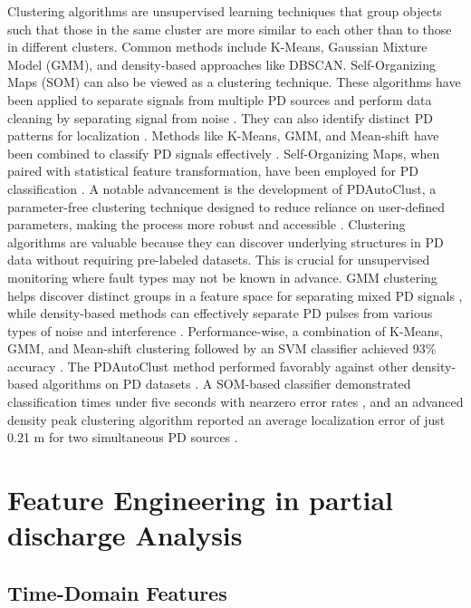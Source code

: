 Clustering algorithms are unsupervised learning techniques that group objects such that those in the same cluster are more similar to each other than to those in different clusters. Common methods include K-Means, Gaussian Mixture Model (GMM), and density-based approaches like DBSCAN. Self-Organizing Maps (SOM) can also be viewed as a clustering technique. These algorithms have been applied to separate signals from multiple PD sources \parencite{Firuzi_2017, Mishra_2019_1} and perform data cleaning by separating signal from noise \parencite{Soh_2022}. They can also identify distinct PD patterns for localization \parencite{Zhou_2021_4}. Methods like K-Means, GMM, and Mean-shift have been combined to classify PD signals effectively \parencite{Carvalho_2024_1}. Self-Organizing Maps, when paired with statistical feature transformation, have been employed for PD classification \parencite{Bohari_2021_1}. A notable advancement is the development of PDAutoClust, a parameter-free clustering technique designed to reduce reliance on user-defined parameters, making the process more robust and accessible \parencite{Rahman_2024_1}. Clustering algorithms are valuable because they can discover underlying structures in PD data without requiring pre-labeled datasets. This is crucial for unsupervised monitoring where fault types may not be known in advance. GMM clustering helps discover distinct groups in a feature space for separating mixed PD signals \parencite{Firuzi_2017}, while density-based methods can effectively separate PD pulses from various types of noise and interference \parencite{Zhou_2021_4}. Performance-wise, a combination of K-Means, GMM, and Mean-shift clustering followed by an SVM classifier achieved 93\% accuracy \parencite{Carvalho_2024_1}. The PDAutoClust method performed favorably against other density-based algorithms on PD datasets \parencite{Rahman_2024_1}. A SOM-based classifier demonstrated classification times under five seconds with nearzero error rates \parencite{Bohari_2021_1}, and an advanced density peak clustering algorithm reported an average localization error of just 0.21 m for two simultaneous PD sources \parencite{Zhou_2021_4}.

\section{Feature Engineering in partial discharge Analysis}

\subsection{Time-Domain Features}

